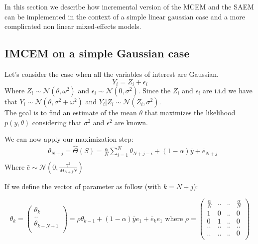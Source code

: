 \documentclass[a0,portrait]{a0poster}
\begin{document}
\begin{multicols}{2}
In this section we describe how incremental version of the MCEM and the SAEM can be implemented in the context of a simple linear gaussian case and a more complicated non linear mixed-effects models.
\subsection{IMCEM on a simple Gaussian case}
Let's consider the case when all the variables of interest are Gaussian.
\begin{equation*}
Y_i = Z_i + \epsilon_i
\end{equation*}
Where $Z_i \sim \mathcal{N}(\theta,\omega^2)$ and $\epsilon_i \sim \mathcal{N}(0,\sigma^2)$.
Since the $Z_i$ and $\epsilon_i$ are i.i.d we have that $Y_i \sim \mathcal{N}(\theta,\sigma^2 + \omega^2)$ and $Y_i|Z_i \sim \mathcal{N}(Z_i,\sigma^2)$.\\
The goal is to find an estimate of the mean $\theta$ that maximizes the likelihood $p(y,\theta)$ considering that $\sigma^2$ and $\epsilon^2$ are known.

\noindent We can now apply our maximization step:
\begin{equation*}
\begin{split}
& \theta_{N+j} = \hat{\Theta}(S) = \frac{\alpha}{N} \sum_{i=1}^{N}{\theta_{N+j-i}} + (1-\alpha)\bar{y} + \bar{e}_{N+j}\\
\end{split}
\end{equation*}
Where $\bar{e} \sim \mathcal{N}(0, \frac{\gamma^2}{M_{N+j}N})$

If we define the vector of parameter as follow (with $k=N+j$):

\begin{equation*}
\theta_{k} = 
\left(
\begin{array}{c}
\theta_{k}\\
..\\
\theta_{k-N+1}\\
\end{array}
\right) = \rho \theta_{k-1} + (1-\alpha)\bar{y}e_1 + \bar{e}_k e_1
\textrm{  where  } \rho = \begin{pmatrix} 
\frac{\alpha}{N} & .. & .. & \frac{\alpha}{N} \\
1 & 0 & .. & 0\\
0 & 1 & .. & 0\\
.. & .. & .. & ..\\
.. & .. & .. & 0\\
\end{pmatrix}
\end{equation*}



\end{multicols}
\end{document}

